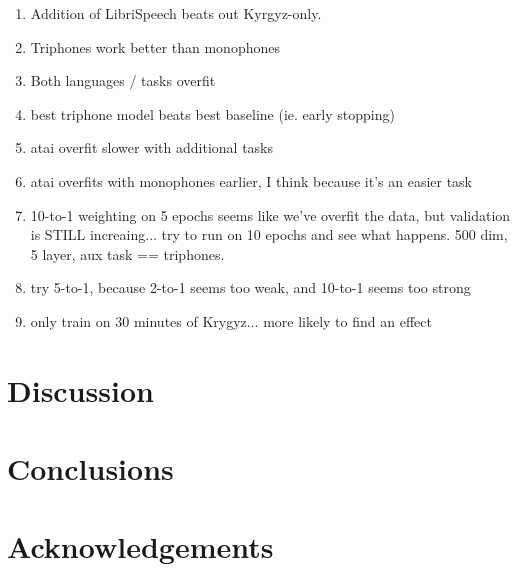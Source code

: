 \documentclass[a4paper]{article}
\begin{document}
\begin{enumerate}
\item Addition of LibriSpeech beats out Kyrgyz-only.
\item Triphones work better than monophones
\item Both languages / tasks overfit
\item best triphone model beats best baseline (ie. early stopping)
\item atai overfit slower with additional tasks
\item atai overfits with monophones earlier, I think because it's an easier task
\item 10-to-1 weighting on 5 epochs seems like we've overfit the data, but validation is STILL increaing... try to run on 10 epochs and see what happens. 500 dim, 5 layer, aux task == triphones.
\item try 5-to-1, because 2-to-1 seems too weak, and 10-to-1 seems too strong
  \item only train on 30 minutes of Krygyz... more likely to find an effect
\end{enumerate}




\section{Discussion}


\section{Conclusions}

\section{Acknowledgements}






\end{document}

